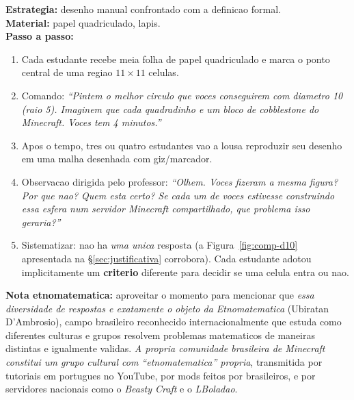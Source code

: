 \documentclass[12pt,a4paper]{scrartcl}
\newcommand{\acc}[1]{\textcolor{accent}{\textbf{#1}}}
\newcommand{\tempo}[1]{\textnormal{\footnotesize\color{bg!90!white}\textsf{#1}}}
\begin{document}
\begin{atividade}[1.2 --- Problematizacao \quad\tempo{15 min}]
\textbf{Estrategia:} desenho manual confrontado com a definicao formal. \\[0.4em]
\textbf{Material:} papel quadriculado, lapis. \\[0.4em]
\textbf{Passo a passo:}
\begin{enumerate}[leftmargin=1.5em,itemsep=0.2em,topsep=0.3em,nosep]
  \item Cada estudante recebe meia folha de papel quadriculado e marca o ponto central de uma regiao $11 \times 11$ celulas.
  \item Comando: \emph{\enquote{Pintem o melhor circulo que voces conseguirem com diametro 10 (raio 5). \emph{Imaginem que cada quadradinho e um bloco de cobblestone do Minecraft.} Voces tem 4 minutos.}}
  \item Apos o tempo, tres ou quatro estudantes vao a lousa reproduzir seu desenho em uma malha desenhada com giz/marcador.
  \item Observacao dirigida pelo professor: \emph{\enquote{Olhem. Voces fizeram a mesma figura? Por que nao? Quem esta certo? Se cada um de voces estivesse construindo essa esfera num servidor Minecraft compartilhado, que problema isso geraria?}}
  \item Sistematizar: nao ha \emph{uma unica} resposta (a Figura~\ref{fig:comp-d10} apresentada na §\ref{sec:justificativa} corrobora). Cada estudante adotou implicitamente um \acc{criterio} diferente para decidir se uma celula entra ou nao.
\end{enumerate}

\textbf{Nota etnomatematica:} aproveitar o momento para mencionar que \emph{essa diversidade de respostas e exatamente o objeto da Etnomatematica} (Ubiratan D'Ambrosio), campo brasileiro reconhecido internacionalmente que estuda como diferentes culturas e grupos resolvem problemas matematicos de maneiras distintas e igualmente validas. \emph{A propria comunidade brasileira de Minecraft constitui um grupo cultural com \enquote{etnomatematica} propria}, transmitida por tutoriais em portugues no YouTube, por mods feitos por brasileiros, e por servidores nacionais como o \emph{Beasty Craft} e o \emph{LBoladao}.
\end{atividade}
\end{document}

